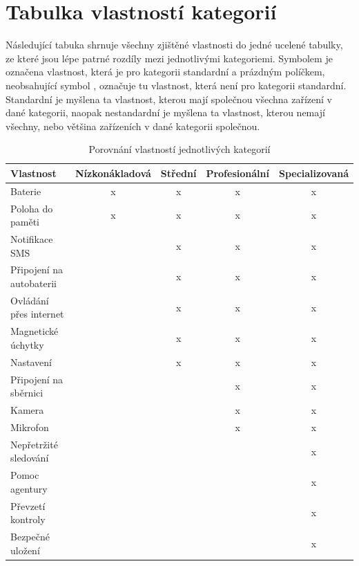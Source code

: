 \documentclass[FM,BP]{tulthesis}  %
\begin{document}

\section{Tabulka vlastností kategorií}
Následující tabuka shrnuje všechny zjištěné vlastnosti do jedné ucelené tabulky, ze které jsou lépe patrné rozdíly mezi jednotlivými kategoriemi. Symbolem  je označena vlastnost, která je pro kategorii standardní a prázdným políčkem, neobsahující symbol , označuje tu vlastnost, která není pro kategorii standardní. Standardní je myšlena ta vlastnost, kterou mají společnou všechna zařízení v dané kategorii, naopak nestandardní je myšlena ta vlastnost, kterou nemají všechny, nebo většina zařízeních v dané kategorii společnou.

\renewcommand{\arraystretch}{1.5}
\begin{table}[H]
\begin{center}
\begin{tabular}{| l | c | c| c | c |}
\hline
Vlastnost & Nízkonákladová & Střední & Profesionální & Specializovaná\\
\hline
\hline
Baterie & x & x & x & x\\
\hline
Poloha do paměti & x & x & x & x\\
\hline
Notifikace SMS & & x & x & x\\
\hline
Připojení na autobaterii & & x & x & x\\
\hline
Ovládání přes internet & & x & x & x\\
\hline
Magnetické úchytky & & x & x & x\\
\hline
Nastavení & & x & x & x\\
\hline
Připojení na sběrnici & & & x & x\\
\hline
Kamera & & & x & x\\
\hline
Mikrofon & & & x & x\\
\hline
Nepřetržité sledování & & & & x\\
\hline
Pomoc agentury & & & & x\\
\hline
Převzetí kontroly & & & & x\\
\hline
Bezpečné uložení & & & & x\\
\hline
\end{tabular}
\end{center}
\caption{Porovnání vlastností jednotlivých kategorií}
\end{table}

\end{document}
